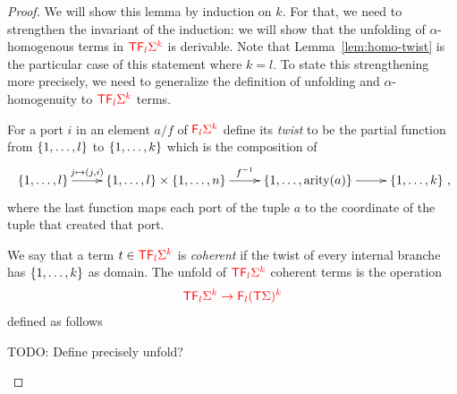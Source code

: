 \begin{proof}
We will show this lemma by induction on $k$. For that, we need to strengthen the invariant of the induction: we will show that the unfolding of $\alpha$-homogenous terms in ${\color{red}{{\color{red}{\mathsf T}}{\color{red}{\mathsf F_{l}}}{\color{red}{\Sigma}}^k}}$ is derivable. Note that Lemma~\ref{lem:homo-twist} is the particular case of this statement where $k=l$. To state this strengthening more precisely, we need to generalize the definition of unfolding and $\alpha$-homogenuity to ${\color{red}{{\color{red}{\mathsf T}}{\color{red}{\mathsf F_{l}}}{\color{red}{\Sigma}}^k}}$ terms.

For a port $i$ in an element $a/f$ of ${\color{red}{{\color{red}{\mathsf F_{l}}}{\color{red}{\Sigma}}^k}}$ define its \emph{twist} to be the partial function from $\{1,\ldots,l\}$ to $\{1,\ldots,k\}$
which is the composition of 
\begin{align*}
\xymatrix{
    \set{1,\ldots,l} \ar[r]^-{j \mapsto {(j,i)}} & \set{1,\ldots,l} \times \set{1,\ldots,n} \ar[r]^-{f^{-1}} & \set{1,\ldots,\arity a} \ar[r] & \set{1,\ldots,k}
},
\end{align*}
where the last function maps each port of the tuple $a$ to the coordinate of the tuple that created that port. 

We say that a term $t\in {\color{red}{{\color{red}{\mathsf T}}{\color{red}{\mathsf F_{l}}}\Sigma^k}}$ is \emph{coherent} if the twist of every internal branche has $\{1,\ldots,k\}$ as domain. The unfold of ${\color{red}{{\color{red}{\mathsf T}}{\color{red}{\mathsf F_{l}}}\Sigma^k}}$ coherent terms is the operation 
\begin{align*}
{\color{red}{{\color{red}{\mathsf T}}{\color{red}{\mathsf F_{l}}}\Sigma^k \to {\color{red}{\mathsf F_{l}}}({\color{red}{\mathsf T}}\Sigma)^k}}
\end{align*}
defined as follows
\begin{center}
TODO: {Define precisely unfold?}
\end{center}


\end{proof}
